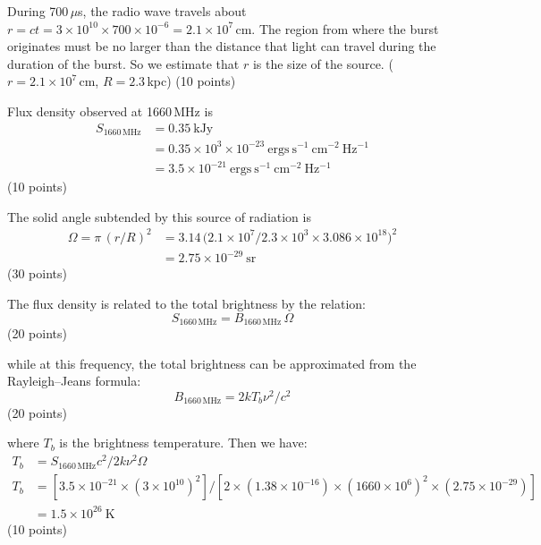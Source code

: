 During 700\,$\mu$s, the radio wave travels about
$r = ct = 3\times10^{10}\times700\times10^{-6} = 2.1\times10^{7}$\,cm. The
region from where the burst originates must be no larger than the distance
that light can travel during the duration of the burst. So we estimate that
$r$ is the size of the source. ($r = 2.1\times10^{7}$\,cm,
$R = 2.3$\,kpc) \hfill(10 points)

Flux density observed at 1660\,MHz is
\begin{align*}
S_{\mathrm{1660\,MHz}} &= 0.35\ \mathrm{kJy}\\
  &= 0.35\times10^{3}\times10^{-23}\
     \mathrm{ergs\ s^{-1}\ cm^{-2}\ Hz^{-1}}\\
  &= 3.5\times10^{-21}\ \mathrm{ergs\ s^{-1}\ cm^{-2}\ Hz^{-1}}
\end{align*}
\hfill(10 points)

The solid angle subtended by this source of radiation is
\begin{align*}
\Omega = \pi\,(r/R)^2
  &= 3.14\,\bigl(2.1\times10^{7}/2.3\times10^{3}\times
     3.086\times10^{18}\bigr)^2\\
  &= 2.75\times10^{-29}\ \mathrm{sr}
\end{align*}
\hfill(30 points)

The flux density is related to the total brightness by the relation:
\[ S_{\mathrm{1660\,MHz}} = B_{\mathrm{1660\,MHz}}\,\Omega \]
\hfill(20 points)

while at this frequency, the total brightness can be approximated from the
Rayleigh--Jeans formula:
\[ B_{\mathrm{1660\,MHz}} = 2kT_b\nu^2/c^2 \]
\hfill(20 points)

where $T_b$ is the brightness temperature. Then we have:
\begin{align*}
T_b &= S_{\mathrm{1660\,MHz}}c^2/2k\nu^2\Omega\\
T_b &= [3.5\times10^{-21}\times(3\times10^{10})^2]/
       [2\times(1.38\times10^{-16})\times(1660\times10^{6})^2
        \times(2.75\times10^{-29})]\\
    &= 1.5\times10^{26}\ \mathrm{K}
\end{align*}
\hfill(10 points)
